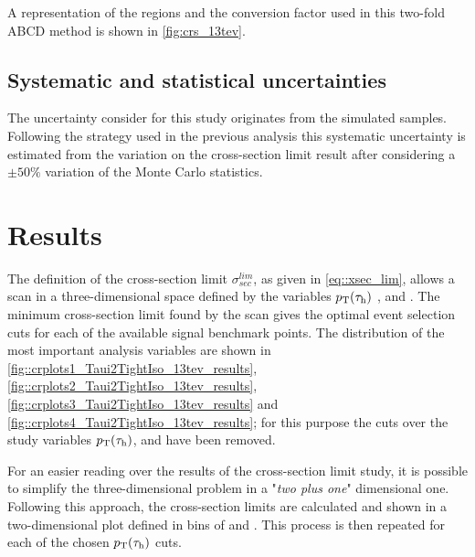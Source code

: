 A representation of the regions and the conversion factor used in this two-fold ABCD method is shown in \autoref{fig:crs_13tev}.

\subsection{Systematic and statistical uncertainties}

The uncertainty consider for this study originates from the simulated samples. Following the strategy used in the previous analysis this systematic uncertainty is estimated from the variation on the cross-section limit result after considering a $\pm 50\%$ variation of the Monte Carlo statistics.

\section{Results}

The definition of the cross-section limit $\sigma^{lim}_{sec}$, as given in \autoref{eq::xsec_lim}, allows a scan in a three-dimensional space defined by the variables $p_{\text{T}}(\tau_{\text{h}})$ , \mjj and \met. The minimum cross-section limit found by the scan gives the optimal event selection cuts for each of the available signal benchmark points. The distribution of the most important analysis variables are shown in \autoref{fig::crplots1_Taui2TightIso_13tev_results}, \autoref{fig::crplots2_Taui2TightIso_13tev_results}, \autoref{fig::crplots3_Taui2TightIso_13tev_results} and \autoref{fig::crplots4_Taui2TightIso_13tev_results}; for this purpose the cuts over the study variables $p_{\text{T}}(\tau_{\text{h}})$, \mjj and \met have been removed. 

For an easier reading over the results of the cross-section limit study, it is possible to simplify the three-dimensional problem in a "\textit{two plus one}" dimensional one. Following this approach, the cross-section limits are calculated and shown in a two-dimensional plot defined in bins of \mjj and \met. This process is then repeated for each of the chosen $p_{\text{T}}(\tau_{\text{h}})$ cuts.

